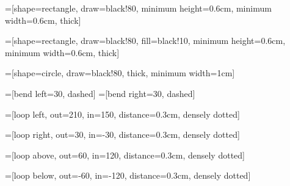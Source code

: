 
\usepackage{tikz}

=[shape=rectangle,
                draw=black!80,
                minimum height=0.6cm,
                minimum width=0.6cm,
                thick]

=[shape=rectangle,
                draw=black!80,
                fill=black!10,
                minimum height=0.6cm,
                minimum width=0.6cm,
                thick]

=[shape=circle,
                draw=black!80,
                thick,
                minimum width=1cm]

=[bend left=30, dashed]
=[bend right=30, dashed]

=[loop left, 
                   out=210, 
                   in=150, 
                   distance=0.3cm,
                   densely dotted]

=[loop right, 
                   out=30, 
                   in=-30, 
                   distance=0.3cm,
                   densely dotted]

=[loop above, 
                   out=60, 
                   in=120, 
                   distance=0.3cm,
                   densely dotted]

=[loop below, 
                   out=-60, 
                   in=-120, 
                   distance=0.3cm,
                   densely dotted]


